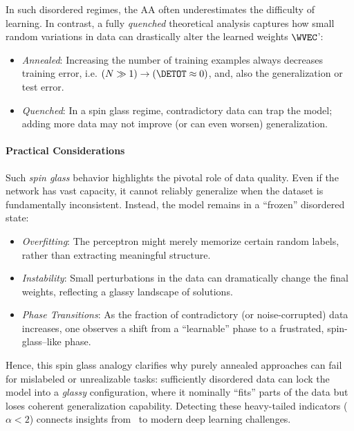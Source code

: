 In such disordered regimes, the AA often underestimates the difficulty of learning.
In contrast, a fully \emph{quenched} theoretical analysis captures
how small random variations in data can drastically alter the learned weights $\WVEC$':
\begin{itemize}
\item \emph{Annealed}: Increasing the number of training examples always decreases training error, i.e. $(N \gg 1) \rightarrow (\DETOT\approx 0)$, and, also the generalization or test error.  
\item \emph{Quenched}: In a spin glass regime, contradictory data can trap the model; adding more data may not improve (or can even worsen) generalization.
\end{itemize}

\paragraph{Practical Considerations}

Such \emph{spin glass} behavior highlights the pivotal role of data quality. Even if the network has vast capacity, it cannot reliably generalize when the dataset is fundamentally inconsistent. Instead, the model remains in a ``frozen'' disordered state:
\begin{itemize}
\item \emph{Overfitting}: The perceptron might merely memorize certain random labels, rather than extracting meaningful structure.
\item \emph{Instability}: Small perturbations in the data can dramatically change the final weights, reflecting a glassy landscape of solutions.
\item \emph{Phase Transitions}: As the fraction of contradictory (or noise-corrupted) data increases, one observes a shift from a ``learnable'' phase to a frustrated, spin-glass--like phase.
\end{itemize}

Hence, this spin glass analogy clarifies why purely annealed approaches can fail for mislabeled or unrealizable tasks: sufficiently disordered data can lock the model into a \emph{glassy} configuration, where it nominally ``fits'' parts of the data but loses coherent generalization capability. Detecting these heavy-tailed indicators ($\alpha < 2$) connects insights from \STATMECH\ to modern deep learning challenges.
